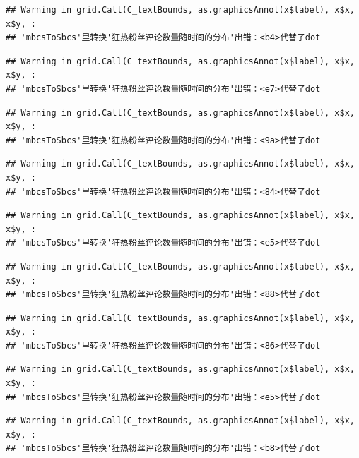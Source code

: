 \documentclass[
]{article}
\begin{document}
\begin{verbatim}
## Warning in grid.Call(C_textBounds, as.graphicsAnnot(x$label), x$x, x$y, :
## 'mbcsToSbcs'里转换'狂热粉丝评论数量随时间的分布'出错：<b4>代替了dot
\end{verbatim}

\begin{verbatim}
## Warning in grid.Call(C_textBounds, as.graphicsAnnot(x$label), x$x, x$y, :
## 'mbcsToSbcs'里转换'狂热粉丝评论数量随时间的分布'出错：<e7>代替了dot
\end{verbatim}

\begin{verbatim}
## Warning in grid.Call(C_textBounds, as.graphicsAnnot(x$label), x$x, x$y, :
## 'mbcsToSbcs'里转换'狂热粉丝评论数量随时间的分布'出错：<9a>代替了dot
\end{verbatim}

\begin{verbatim}
## Warning in grid.Call(C_textBounds, as.graphicsAnnot(x$label), x$x, x$y, :
## 'mbcsToSbcs'里转换'狂热粉丝评论数量随时间的分布'出错：<84>代替了dot
\end{verbatim}

\begin{verbatim}
## Warning in grid.Call(C_textBounds, as.graphicsAnnot(x$label), x$x, x$y, :
## 'mbcsToSbcs'里转换'狂热粉丝评论数量随时间的分布'出错：<e5>代替了dot
\end{verbatim}

\begin{verbatim}
## Warning in grid.Call(C_textBounds, as.graphicsAnnot(x$label), x$x, x$y, :
## 'mbcsToSbcs'里转换'狂热粉丝评论数量随时间的分布'出错：<88>代替了dot
\end{verbatim}

\begin{verbatim}
## Warning in grid.Call(C_textBounds, as.graphicsAnnot(x$label), x$x, x$y, :
## 'mbcsToSbcs'里转换'狂热粉丝评论数量随时间的分布'出错：<86>代替了dot
\end{verbatim}

\begin{verbatim}
## Warning in grid.Call(C_textBounds, as.graphicsAnnot(x$label), x$x, x$y, :
## 'mbcsToSbcs'里转换'狂热粉丝评论数量随时间的分布'出错：<e5>代替了dot
\end{verbatim}

\begin{verbatim}
## Warning in grid.Call(C_textBounds, as.graphicsAnnot(x$label), x$x, x$y, :
## 'mbcsToSbcs'里转换'狂热粉丝评论数量随时间的分布'出错：<b8>代替了dot
\end{verbatim}
\end{document}
